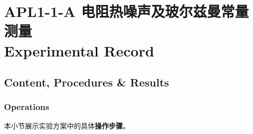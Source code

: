
\section{APL1-1-A 电阻热噪声及玻尔兹曼常量测量 \\ Experimental Record}


\subsection{Content, Procedures \& Results}

\subsubsection{Operations}
本小节展示实验方案中的具体\textbf{操作步骤}。

